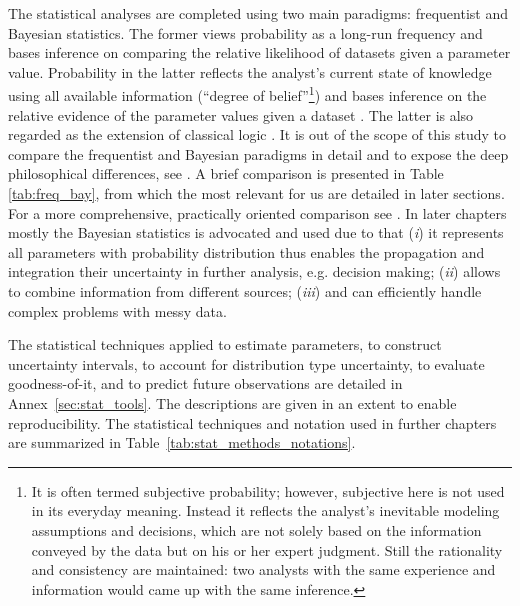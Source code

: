 The statistical analyses are completed using two main paradigms: frequentist and Bayesian statistics. The former views probability as a long-run frequency and bases inference on comparing the relative likelihood of datasets given a parameter value. Probability in the latter reflects the analyst's current state of knowledge using all available  information 
(``degree  of  belief''\footnote{It is often termed subjective probability; however, subjective here is not used in its everyday meaning. Instead it reflects the analyst's inevitable modeling assumptions and decisions, which are not solely based on the information conveyed by the data but on his or her expert judgment. Still the rationality and consistency are maintained: two analysts with the same experience and information would came up with the same inference.})
and  bases inference  on the relative evidence of the parameter values given a dataset \citep{Spiegelhalter2009, Cornell1970}. The latter is also regarded as the extension of classical logic \citep{Jaynes2003}.
It is out of the scope of this study to compare the frequentist and Bayesian paradigms in detail and to expose  the  deep  philosophical differences, see \citet{Jaynes2003, Barnett1999}. A brief comparison is presented in Table \ref{tab:freq_bay}, from which the most relevant for us are detailed in later sections. For a more comprehensive, practically oriented comparison see \citet{Wagenmakers2008, Jaynes1976}.
In later chapters mostly the Bayesian statistics is advocated and used due to that (\textit{i}) it represents all parameters with probability distribution thus enables the propagation and integration their uncertainty in further analysis, e.g. decision making; (\textit{ii}) allows to combine information from different sources; (\textit{iii}) and can efficiently handle complex problems with messy data.

The statistical techniques applied to estimate parameters, to construct uncertainty intervals, to account for distribution type uncertainty, to evaluate goodness-of-it, and to predict future observations are detailed in Annex~\ref{sec:stat_tools}. The descriptions are given in an extent to enable reproducibility.
The statistical techniques and notation used in further chapters are summarized in Table~\ref{tab:stat_methods_notations}.

